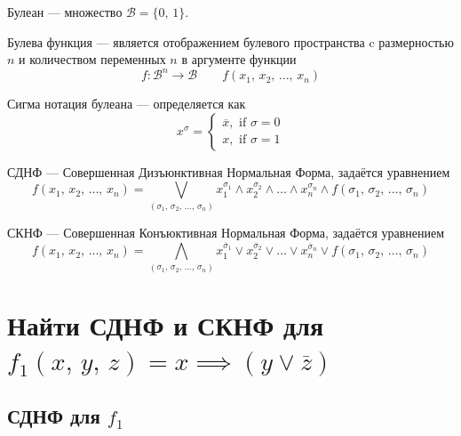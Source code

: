 \documentclass[12pt,a4paper]{article}
\theoremstyle{plain}
\theoremstyle{definition}
\theoremstyle{remark}
\numberwithin{equation}{section}
\begin{document}
Булеан — множество $\mathcal{B} = \{0,\,1\}$.

Булева функция — является отображением булевого пространства c размерностью $n$ и 
количеством переменных $n$ в аргументе функции
\begin{equation*}
  f: \mathcal{B}^n \rightarrow \mathcal{B} \qquad f(x_1,\,x_2,\,\dots,\,x_n)
\end{equation*}

Сигма нотация булеана — определяется как 
\begin{equation*}
  x^\sigma =
  \begin{cases}
    \overline{x}, \text{ if } \sigma = 0 \\
    x, \text{ if } \sigma = 1 
  \end{cases}
\end{equation*}

СДНФ — Совершенная Дизъюнктивная Нормальная Форма, задаётся уравнением
\begin{equation*}
  f(x_1,\,x_2,\,\dots,\,x_n) = \bigvee\limits_{\left(\sigma_1,\,\sigma_2,\,\dots,\,\sigma_n\right)} x_1^{\sigma_1} \land x_2^{\sigma_2} \land \dots \land x_n^{\sigma_n} \land f(\sigma_1,\,\sigma_2,\,\dots,\,\sigma_n)
\end{equation*}

СКНФ — Совершенная Конъюктивная Нормальная Форма, задаётся уравнением 
\begin{equation*}
  f(x_1,\,x_2,\,\dots,\,x_n) = \bigwedge\limits_{\left(\sigma_1,\,\sigma_2,\,\dots,\,\sigma_n\right)} x_1^{\overline{\sigma}_1} \lor x_2^{\overline{\sigma}_2} \lor \dots \lor x_n^{\overline{\sigma}_n} \lor f(\sigma_1,\,\sigma_2,\,\dots,\,\sigma_n)
\end{equation*}

\section{Найти СДНФ и СКНФ для $f_1(x,\,y,\,z) = x \implies (y \lor \overline{z})$}

\subsection{СДНФ для $f_1$}
\end{document}
